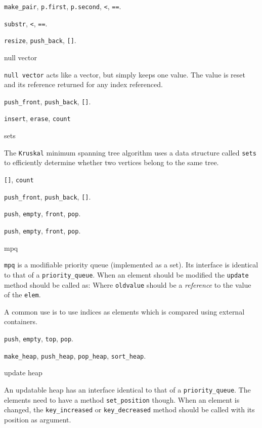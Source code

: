 \categorycontents{}


 {\tt make\_pair}, {\tt p.first}, {\tt p.second}, {\tt <}, {\tt ==}.


 {\tt substr}, {\tt <}, {\tt ==}.


 {\tt resize}, {\tt push\_back}, {\tt []}.
\begin{algorithm}{null vector}

{\tt null vector} acts like a vector, but simply keeps one value.
The value is reset and its reference returned for any index referenced.
\end{algorithm}


 {\tt push\_front}, {\tt push\_back}, {\tt []}.


 {\tt insert}, {\tt erase}, {\tt count}
\begin{algorithm}{sets}

The {\tt Kruskal} minimum spanning tree algorithm uses a data structure
called {\tt sets} to efficiently determine whether two vertices belong to
the same tree.
\end{algorithm}


 {\tt []}, {\tt count}


 {\tt push\_front}, {\tt push\_back}, {\tt []}.


 {\tt push}, {\tt empty}, {\tt front}, {\tt pop}.

 {\tt push}, {\tt empty}, {\tt front}, {\tt pop}.
\begin{algorithm}{mpq}

{\tt mpq} is a modifiable priority queue (implemented as a set). Its interface
is identical to that of a {\tt priority\_queue}. When an element should be
modified the {\tt update} method should be called as:
Where {\tt oldvalue} should be a \emph{reference} to the value of the
{\tt elem}.

A common use is to use indices as elements which is compared using external
containers.
\end{algorithm}

 {\tt push}, {\tt empty}, {\tt top}, {\tt pop}.

 {\tt make\_heap}, {\tt push\_heap}, {\tt pop\_heap}, {\tt sort\_heap}.
\begin{algorithm}{update heap}

An updatable heap has an interface identical to that of a
{\tt priority\_queue}.
The elements need to have a method {\tt set\_position} though. When an element
is changed, the {\tt key\_increased} or {\tt key\_decreased} method should
be called with its position as argument.
\end{algorithm}

\begin{sourceslandscape}
\end{sourceslandscape}
